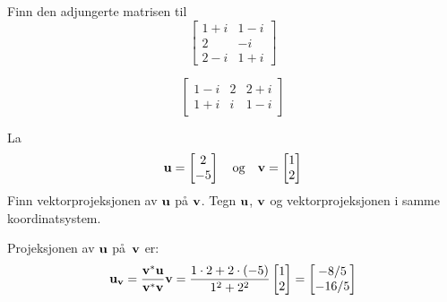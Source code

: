 
\begin{oppgave}
Finn den adjungerte matrisen til
\[
\begin{bmatrix}
 1+i & 1-i\\
 2 & -i\\
 2-i & 1+i
\end{bmatrix}
\]
\end{oppgave}


\begin{losning}
\[
\begin{bmatrix}
 1-i & 2 & 2 + i \\
 1+i & i & 1-i
\end{bmatrix}
\]
\end{losning}


\begin{oppgave}
La
\[
\mathbf{u}= \begin{bmatrix} 2 \\ -5 \end{bmatrix} \quad \text{og} \quad \mathbf{v}=\begin{bmatrix} 1 \\ 2 \end{bmatrix}
\]
Finn vektorprojeksjonen av $\mathbf{u}$ på $\mathbf{v}$. Tegn $\mathbf{u}$, $\mathbf{v}$ og vektorprojeksjonen i samme koordinatsystem. 
\end{oppgave}


\begin{losning}
Projeksjonen av $\mathbf{u}$ på~$\mathbf{v}$ er:
\[
\mathbf{u}_{\mathbf{v}}
= \frac{\mathbf{v}^* \mathbf{u}}{\mathbf{v}^* \mathbf{v}} \mathbf{v}
= \frac{1 \cdot 2 + 2 \cdot (-5)}{1^2 + 2^2} \begin{bmatrix} 1 \\ 2 \end{bmatrix}
= \begin{bmatrix} -8/5 \\ -16/5 \end{bmatrix}
\]
\begin{center}
\end{center}
\end{losning}


